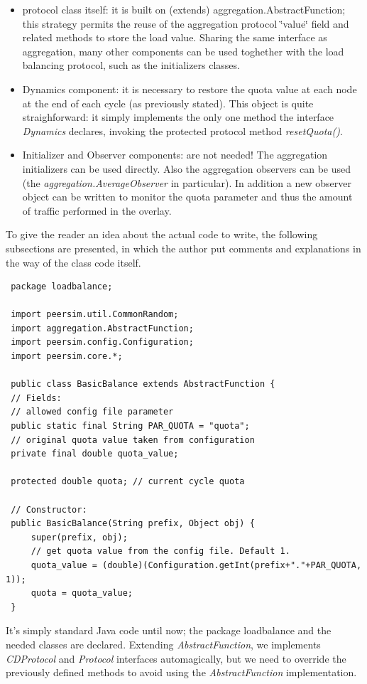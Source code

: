 \documentclass[a4paper,12pt]{article}
\begin{document}
\begin{itemize}
\item protocol class itself: it is built on (extends) aggregation.AbstractFunction;
this strategy permits the reuse of the aggregation protocol \char`\"{}value\char`\"{}
field and related methods to store the load value. Sharing the same
interface as aggregation, many other components can be used toghether
with the load balancing protocol, such as the initializers classes. 
\item Dynamics component: it is necessary to restore the quota value at
each node at the end of each cycle (as previously stated). This object
is quite straighforward: it simply implements the only one method
the interface \emph{Dynamics} declares, invoking the protected protocol
method \emph{resetQuota()}. 
\item Initializer and Observer components: are not needed!
The aggregation initializers can be used directly. Also the aggregation
observers can be used (the \emph{aggregation.AverageObserver} in particular).
In addition a new observer object can be written to monitor the quota
parameter and thus the amount of traffic performed in the overlay.
\end{itemize}
To give the reader an idea about the actual code to write, the following
subsections are presented, in which the author put comments and explanations
in the way of the class code itself.

\footnotesize
\begin{verbatim}
 package loadbalance;
 
 import peersim.util.CommonRandom;
 import aggregation.AbstractFunction;
 import peersim.config.Configuration;
 import peersim.core.*;
 
 public class BasicBalance extends AbstractFunction {
 // Fields:
 // allowed config file parameter
 public static final String PAR_QUOTA = "quota";
 // original quota value taken from configuration 
 private final double quota_value; 
 
 protected double quota; // current cycle quota
 
 // Constructor:
 public BasicBalance(String prefix, Object obj) {
     super(prefix, obj);
     // get quota value from the config file. Default 1.
     quota_value = (double)(Configuration.getInt(prefix+"."+PAR_QUOTA, 1));
     quota = quota_value;
 }
\end{verbatim}
\normalsize


It's simply standard Java code until now; the package loadbalance
and the needed classes are declared. Extending \emph{AbstractFunction},
we implements \emph{CDProtocol} and \emph{Protocol} interfaces automagically,
but we need to override the previously defined methods to avoid using
the \emph{AbstractFunction} implementation.
\end{document}
